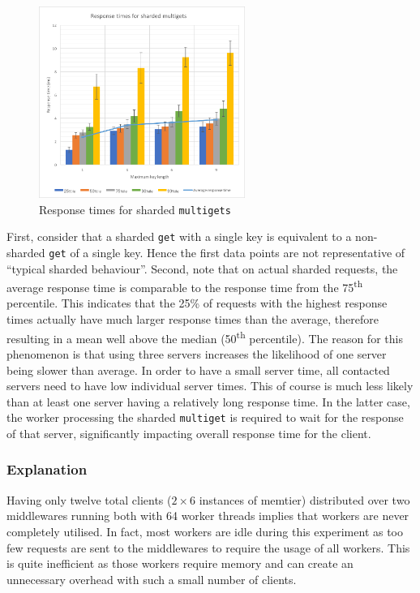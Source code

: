 \documentclass[11pt,a4paper]{article}
\begin{document}
\begin{figure}[!h]
    \centering
    \includegraphics[width=0.6\textwidth]{processing/graphics/get_and_multigets_latency-keylen_sharded.png}
    \caption{Response times for sharded \texttt{multigets}}
    \label{png::get_and_multigets_latency-keylen_sharded}
\end{figure}

First, consider that a sharded \texttt{get} with a single key is equivalent to a non-sharded \texttt{get} of a single key. Hence the first data points are not representative of ``typical sharded behaviour''. Second, note that on actual sharded requests, the average response time is comparable to the response time from the 75\textsuperscript{th} percentile. This indicates that the 25\% of requests with the highest response times actually have much larger response times than the average, therefore resulting in a mean well above the median (50\textsuperscript{th} percentile). The reason for this phenomenon is that using three servers increases the likelihood of one server being slower than average.  In order to have a small server time, all contacted servers need to have low individual server times. This of course is much less likely than at least one server having a relatively long response time. In the latter case, the worker processing the sharded \texttt{multiget} is required to wait for the response of that server, significantly impacting overall response time for the client.

\subsubsection{Explanation}
Having only twelve total clients ($2\times6$ instances of memtier) distributed over two middlewares running both with 64 worker threads implies that workers are never completely utilised. In fact, most workers are idle during this experiment as too few requests are sent to the middlewares to require the usage of all workers. This is quite inefficient as those workers require memory and can create an unnecessary overhead with such a small number of clients.
\end{document}
